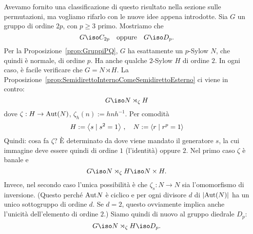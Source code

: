 \begin{esem}%
Avevamo fornito una classificazione di questo risultato nella sezione sulle permutazioni, ma vogliamo rifarlo con le nuove idee appena introdotte. Sia $G$ un gruppo di ordine $2p$, con $p \ge 3$ primo. Mostriamo che
\[G \iso C_{2p} \quad\text{oppure}\quad G \iso D_p .\]
Per la Proposizione~\ref{prop:GruppiPQ}, $G$ ha esattamente un $p$-Sylow $N$, che quindi è normale, di ordine $p$. Ha anche qualche $2$-Sylow $H$ di ordine $2$. In ogni caso, è facile verificare che $G = N \rtimes H$. La Proposizione~\ref{prop:SemidirettoInternoComeSemidirettoEsterno} ci viene in contro:
\[G \iso N \rtimes_\zeta H\]
dove $\zeta : H \to \mathrm{Aut}(N)$, $\zeta_h (n) := hnh^{-1}$. Per comodità
\[H := \left\langle s \mid s^2 = 1\right\rangle \,,\quad N := \left\langle r \mid r^p = 1\right\rangle\]
Quindi: cosa fa $\zeta$? È determinato da dove viene mandato il generatore $s$, la cui immagine deve essere quindi di ordine $1$ (l'identità) oppure $2$. Nel primo caso $\zeta$ è banale e
\[G \iso N \rtimes_\zeta H \iso N \times H .\]
Invece, nel secondo caso l'unica possibilità è che $\zeta_s : N \to N$ sia l'omomorfismo di inversione. (Questo perché $\mathrm{Aut} N$ è ciclico e per ogni divisore $d$ di $\left\lvert\mathrm{Aut}(N)\right\rvert$ ha un unico sottogruppo di ordine $d$. Se $d = 2$, questo ovviamente implica anche l'unicità dell'elemento di ordine $2$.) Siamo quindi di nuovo al gruppo diedrale $D_p$:
\[G \iso N \rtimes_\zeta H \iso D_p .\]
\end{esem}

